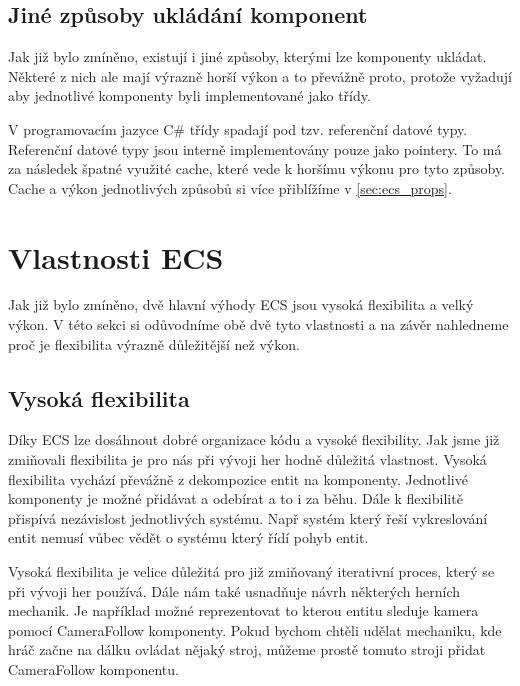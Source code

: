 


\subsection{Jiné způsoby ukládání komponent}
Jak již bylo zmíněno, existují i jiné způsoby, kterými lze komponenty ukládat. Některé z nich ale mají výrazně horší výkon a to převážně proto, protože vyžadují aby jednotlivé komponenty byli implementované jako třídy.

V programovacím jazyce C\# třídy spadají pod tzv. referenční datové typy. Referenční datové typy jsou interně implementovány pouze jako pointery. To má za následek špatné využité cache, které vede k horšímu výkonu pro tyto způsoby. Cache a výkon jednotlivých způsobů si více přiblížíme v \ref{sec:ecs_props}.


\section{Vlastnosti ECS}
Jak již bylo zmíněno, dvě hlavní výhody ECS jsou vysoká flexibilita a velký výkon. V této sekci si odůvodníme obě dvě tyto vlastnosti a na závěr nahledneme proč je flexibilita výrazně důležitější než výkon.

\subsection{Vysoká flexibilita}

Díky ECS lze dosáhnout dobré organizace kódu a vysoké flexibility. Jak jsme již zmiňovali flexibilita je pro nás při vývoji her hodně důležitá vlastnost. Vysoká flexibilita vychází převážně z dekompozice entit na komponenty. Jednotlivé komponenty je možné přidávat a odebírat a to i za běhu. Dále k flexibilitě přispívá nezávislost jednotlivých systému. Např systém který řeší vykreslování entit nemusí vůbec vědět o systému který řídí pohyb entit.

Vysoká flexibilita je velice důležitá pro již zmiňovaný iterativní proces, který se při vývoji her používá. Dále nám také usnadňuje návrh některých herních mechanik. Je například možné reprezentovat to kterou entitu sleduje kamera pomocí CameraFollow komponenty. Pokud bychom chtěli udělat mechaniku, kde hráč začne na dálku ovládat nějaký stroj, můžeme prostě tomuto stroji přidat CameraFollow komponentu.

